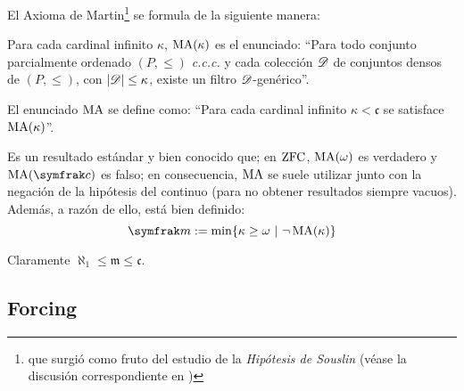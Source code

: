 El Axioma de Martin\footnote{que surgió como fruto del estudio de la \textit{Hipótesis de Souslin} (véase la discusión correspondiente en \cite{kunenSet})} se formula de la siguiente manera:
\begin{definicion}\label{def-AxMartin}\index[sym]{$\Ma(\kappa)$}\index[sym]{$\Ma$}
	Para cada cardinal infinito $\kappa$, $\Ma(\kappa)$ es el enunciado: ``Para todo conjunto parcialmente ordenado $(P,\leq)$ \textit{c.c.c.} y cada colección $\mathscr{D}$ de conjuntos densos de $(P,\leq)$, con $|\mathscr{D}|\leq \kappa$, existe un filtro $\mathscr{D}$-genérico''.

	El enunciado $\Ma$ se define como: ``Para cada cardinal infinito $\kappa<\mathfrak{c}$ se satisface $\Ma(\kappa)$''.
\end{definicion}

Es un resultado estándar y bien conocido que; en $\operatorname{ZFC}$, $\operatorname{MA}(\omega)$ es verdadero y $\Ma(\mathfrak{c})$ es falso; en consecuencia, $\Ma$ se suele utilizar junto con la negación de la hipótesis del continuo (para no obtener resultados siempre vacuos). Además, a razón de ello, está bien definido:
$$ \mathfrak{m}:=\min\{ \kappa \geq \omega \tq \lnot \Ma(\kappa) \} $$

Claramente $\aleph_1 \leq \mathfrak{m} \leq \mathfrak{c}$.

\subsection{Forcing}
